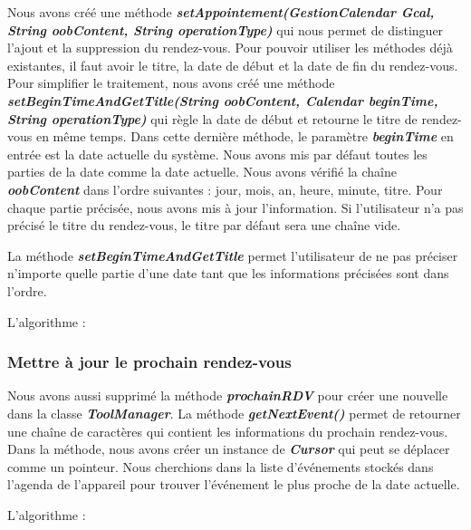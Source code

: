 \indent Nous avons créé une méthode \textbf{\emph{setAppointement(GestionCalendar Gcal, String oobContent, String operationType)}} qui nous permet de distinguer l'ajout et la suppression du rendez-vous. Pour pouvoir utiliser les méthodes déjà existantes, il faut avoir le titre, la date de début et la date de fin du rendez-vous. Pour simplifier le traitement, nous avons créé une méthode \textbf{\emph{setBeginTimeAndGetTitle(String oobContent, Calendar beginTime, String operationType)}} qui règle la date de début et retourne le titre de rendez-vous en même temps. Dans cette dernière méthode, le paramètre \textbf{\emph{beginTime}} en entrée est la date actuelle du système. Nous avons mis par défaut toutes les parties de la date comme la date actuelle. Nous avons vérifié la chaîne \textbf{\emph{oobContent}} dans l'ordre suivantes : jour, mois, an, heure, minute, titre. Pour chaque partie précisée, nous avons mis à jour l'information. Si l'utilisateur n'a pas précisé le titre du rendez-vous, le titre par défaut sera une chaîne vide.

\indent La méthode \textbf{\emph{setBeginTimeAndGetTitle}} permet l'utilisateur de ne pas préciser n'importe quelle partie d'une date tant que les informations précisées sont dans l'ordre.

\indent L'algorithme :



\subsubsection*{Mettre à jour le prochain rendez-vous}

\indent Nous avons aussi supprimé la méthode \textbf{\emph{prochainRDV}} pour créer une nouvelle dans la classe \textbf{\emph{ToolManager}}. La méthode \textbf{\emph{getNextEvent()}} permet de retourner une chaîne de caractères qui contient les informations du prochain rendez-vous. Dans la méthode, nous avons créer un instance de \textbf{\emph{Cursor}} qui peut se déplacer comme un pointeur. Nous cherchions dans la liste d'événements stockés dans l'agenda de l'appareil pour trouver l'événement le plus proche de la date actuelle.

\indent L'algorithme :
